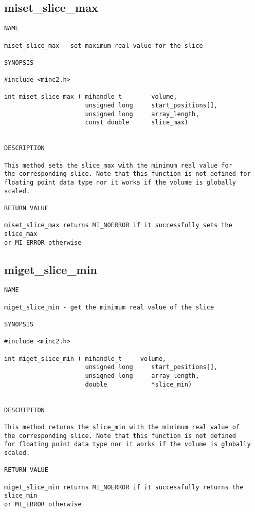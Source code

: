 \documentclass{article}
\begin{document}
\subsection{miset\_slice\_max}
\begin{verbatim}
NAME 

miset_slice_max - set maximum real value for the slice

SYNOPSIS

#include <minc2.h>

int miset_slice_max ( mihandle_t        volume,
                      unsigned long     start_positions[],
                      unsigned long     array_length,
                      const double      slice_max)
                       
                                
DESCRIPTION

This method sets the slice_max with the minimum real value for
the corresponding slice. Note that this function is not defined for
floating point data type nor it works if the volume is globally scaled.

RETURN VALUE

miset_slice_max returns MI_NOERROR if it successfully sets the slice_max
or MI_ERROR otherwise
\end{verbatim}

\subsection{miget\_slice\_min}
\begin{verbatim}
NAME 

miget_slice_min - get the minimum real value of the slice

SYNOPSIS

#include <minc2.h>

int miget_slice_min ( mihandle_t     volume,
                      unsigned long     start_positions[],
                      unsigned long     array_length,
                      double            *slice_min)
                       
                                
DESCRIPTION

This method returns the slice_min with the minimum real value of
the corresponding slice. Note that this function is not defined 
for floating point data type nor it works if the volume is globally scaled.

RETURN VALUE

miget_slice_min returns MI_NOERROR if it successfully returns the slice_min
or MI_ERROR otherwise
\end{verbatim}
\end{document}
